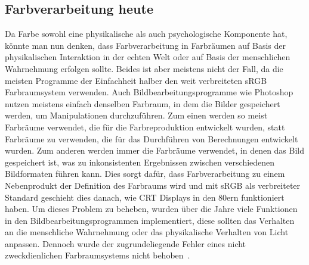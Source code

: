 \documentclass[12pt, a4paper, ngerman]{article}
\begin{document}
\subsection{Farbverarbeitung heute}
Da Farbe sowohl eine physikalische als auch psychologische Komponente hat, könnte man nun denken, 
dass Farbverarbeitung in Farbräumen auf Basis der physikalischen Interaktion in der echten Welt oder 
auf Basis der menschlichen Wahrnehmung erfolgen sollte.
Beides ist aber meistens nicht der Fall, da die meisten Programme der Einfachheit halber den weit verbreiteten sRGB Farbraumsystem verwenden.
Auch Bildbearbeitungsprogramme wie Photoshop nutzen meistens einfach denselben Farbraum, 
in dem die Bilder gespeichert werden, um Manipulationen durchzuführen. 
Zum einen werden so meist Farbräume verwendet, die für die Farbreproduktion entwickelt wurden, 
statt Farbräume zu verwenden, die für das Durchführen von Berechnungen entwickelt wurden.
Zum anderen werden immer die Farbräume verwendet, in denen das Bild gespeichert ist, 
was zu inkonsistenten Ergebnissen zwischen verschiedenen Bildformaten führen kann.
Dies sorgt dafür, dass Farbverarbeitung zu einem Nebenprodukt der Definition des Farbraums wird und 
mit sRGB als verbreiteter Standard geschieht dies danach, wie \acs{CRT} Displays in den 80ern funktioniert haben.
Um dieses Problem zu beheben, wurden über die Jahre viele Funktionen in den Bildbearbeitungsprogrammen implementiert, 
diese sollten das Verhalten an die menschliche Wahrnehmung oder das physikalische Verhalten von Licht anpassen. 
Dennoch wurde der zugrundeliegende Fehler eines nicht zweckdienlichen Farbraumsystems nicht behoben~\cite{Ottosson_2020}.
\end{document}
